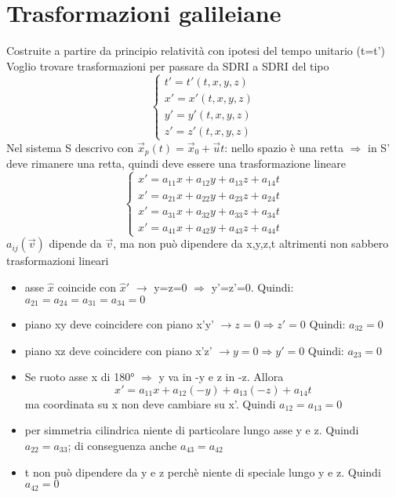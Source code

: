 \documentclass[a4paper,11pt]{report}
\theoremstyle{remark}
\theoremstyle{definition}
\begin{document}
\section{Trasformazioni galileiane}

Costruite a partire da principio relatività con ipotesi del tempo unitario (t=t') \newline
Voglio trovare trasformazioni per passare da SDRI a SDRI del tipo
\begin{equation*}
    \begin{cases}
        t' = t'(t,x,y,z) \\
        x' = x'(t,x,y,z) \\
        y' = y'(t,x,y,z) \\
        z' = z'(t,x,y,z)
    \end{cases}
\end{equation*}
Nel sistema S descrivo con $\vec{x}_p(t) = \vec{x}_0 + \vec{u}t$: nello spazio è una retta $\Rightarrow$ in S' deve rimanere una retta, quindi deve essere una trasformazione lineare
\begin{equation*}
    \begin{cases}
        x' = a_{11}x +  a_{12}y +  a_{13}z +  a_{14}t \\
        x' = a_{21}x +  a_{22}y +  a_{23}z +  a_{24}t \\
        x' = a_{31}x +  a_{32}y +  a_{33}z +  a_{34}t \\
        x' = a_{41}x +  a_{42}y +  a_{43}z +  a_{44}t 
    \end{cases}
\end{equation*}
$a_{ij}(\vec{v})$ dipende da $\vec{v}$, ma non può dipendere da x,y,z,t altrimenti non sabbero trasformazioni lineari
\begin{itemize}
    \item asse $\hat{x}$ coincide con $\hat{x}'$ $\rightarrow$ y=z=0 $\Rightarrow$ y'=z'=0. Quindi: $a_{21}=a_{24}=a_{31}=a_{34}=0$
    \item piano xy deve coincidere con piano x'y' $\rightarrow z=0 \Rightarrow z'=0 $ Quindi: $a_{32}=0$
    \item piano xz deve coincidere con piano x'z' $\rightarrow y=0 \Rightarrow y'=0 $ Quindi: $a_{23}=0$
    \item Se ruoto asse x di 180° $\Rightarrow$ y va in -y e z in -z. Allora
    \begin{equation*}
        x' = a_{11}x +  a_{12}(-y)+  a_{13}(-z) +  a_{14}t
    \end{equation*}
    ma coordinata su x non deve cambiare su x'. Quindi $a_{12}=a_{13}=0$
    \item per simmetria cilindrica niente di particolare lungo asse y e z. Quindi $a_{22}=a_{33}$; di conseguenza anche $a_{43}=a_{42}$
    \item t non può dipendere da y e z perchè niente di speciale lungo y e z. Quindi $a_{42}=0$
\end{itemize}
\end{document}
